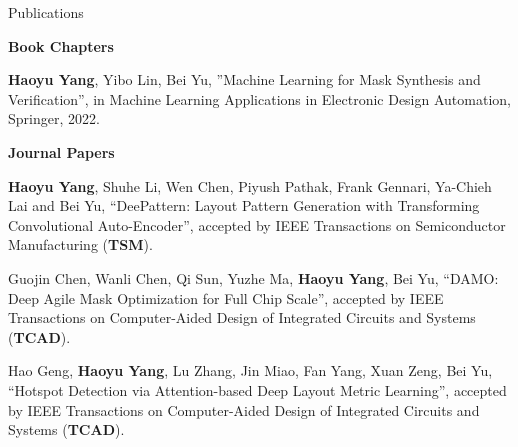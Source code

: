 \clearpage
\begin{rSection}{Publications}
	
\iftrue



\textbf{Book Chapters}
\begin{description}[font=\normalfont]
	
	\item[{[B1]}]{
		\textbf{Haoyu Yang}, Yibo Lin, Bei Yu,
		''Machine Learning for Mask Synthesis and Verification'', 
		in Machine Learning Applications in Electronic Design Automation,
		Springer, 2022.
	}
	
\end{description}


\textbf{Journal Papers}
\begin{description}[font=\normalfont]

\item[{[J15]}]{
	\textbf{Haoyu Yang}, Shuhe Li, Wen Chen, Piyush Pathak, Frank Gennari, Ya-Chieh Lai and Bei Yu, ``DeePattern: Layout Pattern Generation with Transforming Convolutional Auto-Encoder'',
	accepted by IEEE Transactions on Semiconductor Manufacturing (\textbf{TSM}).
}

\item[{[J14]}]{
	Guojin Chen, Wanli Chen, Qi Sun, Yuzhe Ma, \textbf{Haoyu Yang}, Bei Yu,
	``DAMO: Deep Agile Mask Optimization for Full Chip Scale'', 
	accepted by IEEE Transactions on Computer-Aided Design of Integrated Circuits and Systems (\textbf{TCAD}).
}

\item[{[J13]}]{
	Hao Geng, \textbf{Haoyu Yang}, Lu Zhang, Jin Miao, Fan Yang, Xuan Zeng, Bei Yu,
	``Hotspot Detection via Attention-based Deep Layout Metric Learning'', 
	accepted by IEEE Transactions on Computer-Aided Design of Integrated Circuits and Systems (\textbf{TCAD}).
}
	

\end{description}
\end{rSection}
